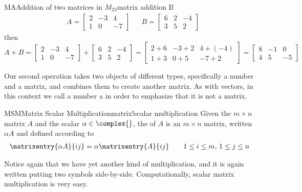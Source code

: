 %
\begin{example}{MA}{Addition of two matrices in $M_{23}$}{matrix addition}
If
%
\begin{align*}
A=
\begin{bmatrix}
2&-3&4\\
1&0&-7
\end{bmatrix}
&&
B=
\begin{bmatrix}
6&2&-4\\
3&5&2
\end{bmatrix}
\end{align*}
%
then
%
\begin{equation*}
A+B=
\begin{bmatrix}
2&-3&4\\
1&0&-7
\end{bmatrix}
+
\begin{bmatrix}
6&2&-4\\
3&5&2
\end{bmatrix}
=
\begin{bmatrix}
2+6&-3+2&4+(-4)\\
1+3&0+5&-7+2
\end{bmatrix}
=\begin{bmatrix}
8&-1&0\\
4&5&-5
\end{bmatrix}
\end{equation*}
%
\end{example}
%
Our second operation takes two objects of different types, specifically a number and a matrix, and combines them to create another matrix.  As with vectors, in this context we call a number a  in order to emphasize that it is not a matrix.
%
\begin{definition}{MSM}{Matrix Scalar Multiplication}{matrix!scalar multiplication}
Given the $m\times n$ matrix $A$
and the scalar $\alpha\in\complex{\null}$, the  of $A$ is an $m\times n$ matrix, written $\alpha A$ and defined according to
%
\begin{align*}
\matrixentry{\alpha A}{ij}&=\alpha\matrixentry{A}{ij}&&
\quad 1\leq i\leq m,\,1\leq j\leq n
\end{align*}
%
\end{definition}
%
Notice again that we have yet another kind of multiplication, and it is again written putting two symbols side-by-side.  Computationally, scalar matrix multiplication is very easy.
%
